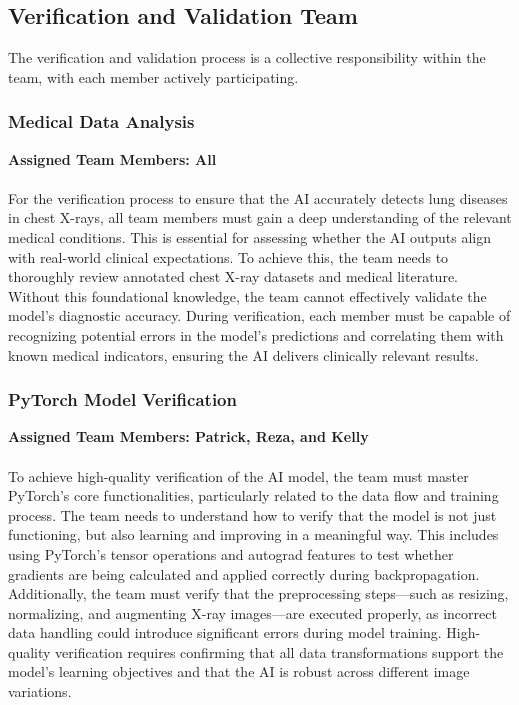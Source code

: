 \documentclass[12pt, titlepage]{article}
\begin{document}
\subsection{Verification and Validation Team}

The verification and validation process is a collective responsibility within the team,
with each member actively participating.

\subsubsection{Medical Data Analysis}
\textbf{Assigned Team Members: All} \\\\
For the verification process to ensure that the AI accurately detects lung diseases in chest X-rays, all team members must gain a deep understanding of the relevant medical conditions. This is essential for assessing whether the AI outputs align with real-world clinical expectations. To achieve this, the team needs to thoroughly review annotated chest X-ray datasets and medical literature. Without this foundational knowledge, the team cannot effectively validate the model's diagnostic accuracy. During verification, each member must be capable of recognizing potential errors in the model's predictions and correlating them with known medical indicators, ensuring the AI delivers clinically relevant results.
\subsubsection{PyTorch Model Verification} 
\textbf{Assigned Team Members: Patrick, Reza, and Kelly}\\\\
To achieve high-quality verification of the AI model, the team must master PyTorch's core functionalities, particularly related to the data flow and training process. The team needs to understand how to verify that the model is not just functioning, but also learning and improving in a meaningful way. This includes using PyTorch's tensor operations and autograd features to test whether gradients are being calculated and applied correctly during backpropagation. Additionally, the team must verify that the preprocessing steps—such as resizing, normalizing, and augmenting X-ray images—are executed properly, as incorrect data handling could introduce significant errors during model training. High-quality verification requires confirming that all data transformations support the model's learning objectives and that the AI is robust across different image variations.
\end{document}
